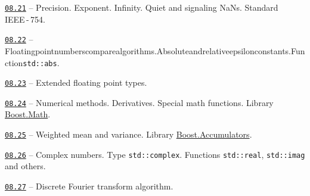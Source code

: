 \documentclass[a4paper,12pt]{article}
\renewenvironment{itemize}
{
    \begin{list}{\labelitemi}
    {
      \setlength{\topsep}{0pt}
      \setlength{\partopsep}{0pt}
      \setlength{\parskip}{0pt}
      \setlength{\itemsep}{0pt}
      \setlength{\parsep}{0pt}
      \setlength{\leftmargin}{14.5pt}
    }
}{\end{list}}
\begin{document}
\begin{itemize}

    \item \href{https://github.com/i-s-m-mipt/Education/blob/master/projects/examples/source/08.21.cpp}{\texttt{08.21}} -- Precision. Exponent. Infinity. Quiet and signaling NaNs. Standard IEEE\,-\,754.

    \smallskip

    \item \href{https://github.com/i-s-m-mipt/Education/blob/master/projects/examples/source/08.22.cpp}{\texttt{08.22}} -- Floating\:point\:numbers\:compare\:algorithms.\:Absolute\:and\:relative\:epsilon\:constants.\:Function\:\lstinline{std::abs}.

    \smallskip

    \item \href{https://github.com/i-s-m-mipt/Education/blob/master/projects/examples/source/08.23.cpp}{\texttt{08.23}} -- Extended floating point types.

    \smallskip

    \item \href{https://github.com/i-s-m-mipt/Education/blob/master/projects/examples/source/08.24.cpp}{\texttt{08.24}} -- Numerical methods. Derivatives. Special math functions. Library \href{https://www.boost.org/doc/libs/1_84_0/libs/math/doc/html/index.html}{Boost.Math}.

    \smallskip

    \item \href{https://github.com/i-s-m-mipt/Education/blob/master/projects/examples/source/08.25.cpp}{\texttt{08.25}} -- Weighted mean and variance. Library \href{https://www.boost.org/doc/libs/1_89_0/doc/html/accumulators.html}{Boost.Accumulators}.

    \smallskip

    \item \href{https://github.com/i-s-m-mipt/Education/blob/master/projects/examples/source/08.26.cpp}{\texttt{08.26}} -- Complex numbers. Type \lstinline{std::complex}. Functions \lstinline{std::real}, \lstinline{std::imag} and others.

    \smallskip

    \item \href{https://github.com/i-s-m-mipt/Education/blob/master/projects/examples/source/08.27.cpp}{\texttt{08.27}} -- Discrete Fourier transform algorithm.

\end{itemize}
\end{document}
